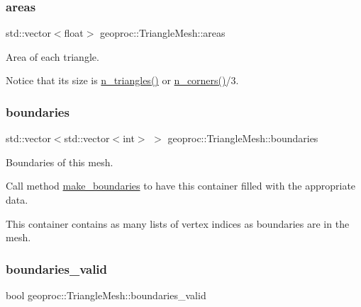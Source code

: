 \subsubsection{\texorpdfstring{areas}{areas}}
{\footnotesize\ttfamily std\+::vector$<$float$>$ geoproc\+::\+Triangle\+Mesh\+::areas\hspace{0.3cm}{\ttfamily [protected]}}



Area of each triangle. 

Notice that its size is \hyperlink{classgeoproc_1_1TriangleMesh_ac6db86ebd1e12d187f4bd4fcbb1e0809}{n\+\_\+triangles()} or \hyperlink{classgeoproc_1_1TriangleMesh_a6b8c186ba032170de9d4f36b4c1d298b}{n\+\_\+corners()}/3. \mbox{\label{classgeoproc_1_1TriangleMesh_a57162eac37831c87786a8dab8331d72f}} 
\subsubsection{\texorpdfstring{boundaries}{boundaries}}
{\footnotesize\ttfamily std\+::vector$<$std\+::vector$<$int$>$ $>$ geoproc\+::\+Triangle\+Mesh\+::boundaries\hspace{0.3cm}{\ttfamily [protected]}}



Boundaries of this mesh. 

Call method \hyperlink{classgeoproc_1_1TriangleMesh_ad11c9406e2677e4d72d53837206fd769}{make\+\_\+boundaries} to have this container filled with the appropriate data.

This container contains as many lists of vertex indices as boundaries are in the mesh. \mbox{\label{classgeoproc_1_1TriangleMesh_a1384fa834aaa4ec3dc7c3b025b1ca528}} 
\subsubsection{\texorpdfstring{boundaries\+\_\+valid}{boundaries\_valid}}
{\footnotesize\ttfamily bool geoproc\+::\+Triangle\+Mesh\+::boundaries\+\_\+valid\hspace{0.3cm}{\ttfamily [protected]}}



